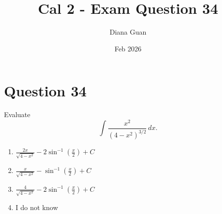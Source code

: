 \documentclass{article}
\title{\textbf{Cal 2 - Exam Question 34}}
\author{Diana Guan}
\date{Feb 2026}
\begin{document}
\maketitle

    \section*{Question 34}
    Evaluate
    \[
    \int \frac{x^2}{(4-x^2)^{3/2}}\, dx.
    \]
    
    \begin{enumerate}[label = \alph*.]
        \item $\displaystyle \frac{2x}{\sqrt{4-x^2}} - 2\sin^{-1}\!\left(\frac{x}{2}\right) + C$
        \item $\displaystyle \frac{x}{\sqrt{4-x^2}} - \sin^{-1}\!\left(\frac{x}{2}\right) + C$
        \item $\displaystyle \frac{4}{\sqrt{4-x^2}} - 2\sin^{-1}\!\left(\frac{x}{2}\right) + C$
        \item I do not know
    \end{enumerate}
\end{document}
